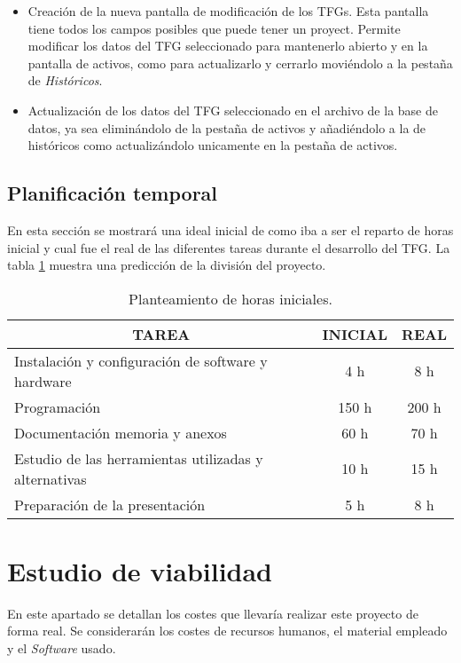 \begin{itemize}
\begin{itemize}
		\item Creación de la nueva pantalla de modificación de los TFGs. Esta pantalla tiene todos los campos posibles que puede tener un proyect. Permite modificar los datos del TFG seleccionado para mantenerlo abierto y en la pantalla de activos, como para actualizarlo y cerrarlo moviéndolo a la pestaña de \emph{Históricos}.
		\item Actualización de los datos del TFG seleccionado en el archivo de la base de datos, ya sea eliminándolo de la pestaña de activos y añadiéndolo a la de históricos como actualizándolo unicamente en la pestaña de activos.
	\end{itemize}
\end{itemize}

\subsection{Planificación temporal}

En esta sección se mostrará una ideal inicial de como iba a ser el reparto de horas inicial y cual fue el real de las diferentes tareas durante el desarrollo del TFG. La tabla \ref{horas} muestra una predicción de la división del proyecto.

\begin{table}[]
	\label{horas}
	\centering
	\begin{tabular}{|l|c|c|}
		\hline
		\multicolumn{1}{|c|}{\textbf{TAREA}}     & \textbf{INICIAL} & \textbf{REAL} \\ \hline
		Instalación y configuración de software y hardware & 4 h & 8 h  \\ \hline
		Programación                            & 150 h  & 200 h       \\ \hline
		Documentación memoria y anexos          & 60 h   & 70 h     \\ \hline
		Estudio de las herramientas utilizadas y alternativas & 10 h & 15 h \\ \hline
		Preparación de la presentación		    & 5 h   & 8 h        \\ \hline
	\end{tabular}
	\caption{Planteamiento de horas iniciales.}
\end{table}


\section{Estudio de viabilidad}
En este apartado se detallan los costes que llevaría realizar este proyecto de forma real. Se considerarán los costes de recursos humanos, el material empleado y el \emph{Software} usado. 

